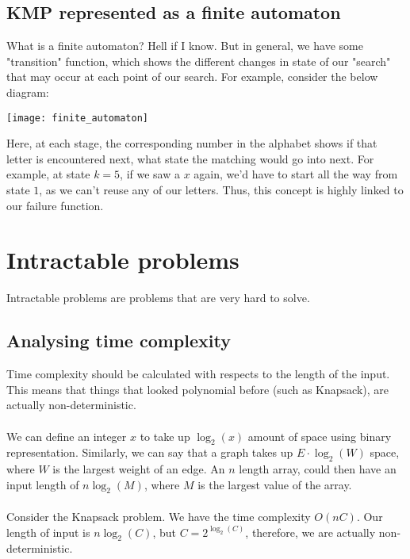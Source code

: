 \documentclass[journal, letterpaper]{IEEEtran}
\begin{document}
  \subsection{KMP represented as a finite automaton}
  What is a finite automaton? Hell if I know. But in general, we have some "transition" function, which shows the different
  changes in state of our "search" that may occur at each point of our search. For example, consider the below diagram:
  \begin{center}
    \texttt{[image: finite\_automaton]}
  \end{center}
  Here, at each stage, the corresponding number in the alphabet shows if that letter is encountered next, what state the
  matching would go into next. For example, at state $k = 5$, if we saw a $x$ again, we'd have to start all the way from
  state $1$, as we can't reuse any of our letters. Thus, this concept is highly linked to our failure function.
  \section{Intractable problems}
  Intractable problems are problems that are very hard to solve.
  \subsection{Analysing time complexity}
  Time complexity should be calculated with respects to the length of the input. This means that things that looked polynomial before
  (such as Knapsack), are actually non-deterministic. \\ \\ We can define an integer $x$ to take up $\log_2(x)$ amount of space using
  binary representation. Similarly, we can say that a graph takes up $E\cdot \log_2(W)$ space, where $W$ is the largest weight
  of an edge. An $n$ length array, could then have an input length of $n \log_2(M)$, where $M$ is the largest value of the array. \\ \\ 
  Consider the Knapsack problem. We have the time complexity $O(nC)$. Our length of input is $n\log_2(C)$, but $C = 2^{\log_2(C)}$, 
  therefore, we are actually non-deterministic.
\end{document}
